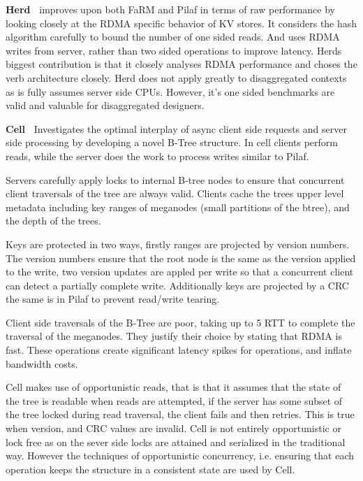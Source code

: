 \textbf{Herd~\cite{herd}} improves upon both FaRM and Pilaf in terms of raw performance by looking
closely at the RDMA specific behavior of KV stores. It considers the hash
algorithm carefully to bound the number of one sided reads. And uses RDMA writes
from server, rather than two sided operations to improve latency. Herds biggest
contribution is that it closely analyses RDMA performance and choses the verb
architecture closely. Herd does not apply greatly to disaggregated contexts as
is fully assumes server side CPUs. However, it's one sided benchmarks are valid
and valuable for disaggregated designers.


\textbf{Cell~\cite{cell}} Investigates the optimal interplay of async client
side requests and server side processing by developing a novel B-Tree structure.
In cell clients perform reads, while the server does the work to process writes
similar to Pilaf.

Servers carefully apply locks to internal B-tree nodes to ensure that concurrent
client traversals of the tree are always valid. Clients cache the trees upper
level metadata including key ranges of meganodes (small partitions of the
btree), and the depth of the trees.

Keys are protected in two ways, firstly ranges are projected by version numbers.
The version numbers ensure that the root node is the same as the version applied
to the write, two version updates are appled per write so that a concurrent
client can detect a partially complete write. Additionally keys are projected by
a CRC the same is in Pilaf to prevent read/write tearing.

Client side traversals of the B-Tree are poor, taking up to 5 RTT to complete
the traversal of the meganodes. They justify their choice by stating that RDMA
is fast. These operations create significant latency spikes for operations, and
inflate bandwidth costs.

Cell makes use of opportunistic reads, that is that it assumes that the state of
the tree is readable when reads are attempted, if the server has some subset of
the tree locked during read traversal, the client fails and then retries. This
is true when version, and CRC values are invalid. Cell is not entirely
opportunistic or lock free as on the sever side locks are attained and
serialized in the traditional way. However the techniques of opportunistic
concurrency, i.e. ensuring that each operation keeps the structure in a
consistent state are used by Cell.



